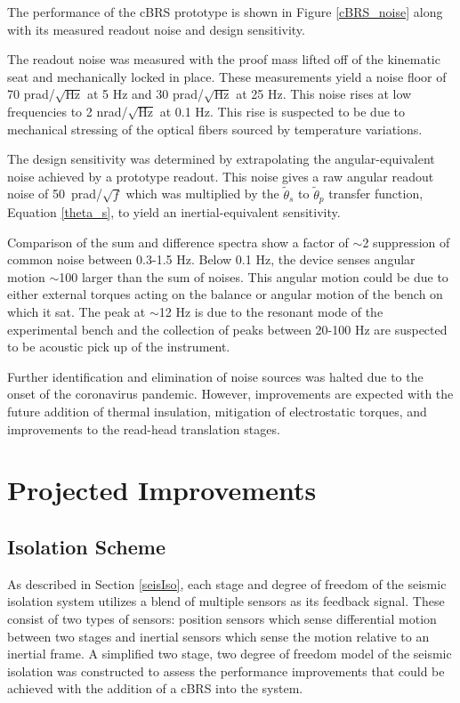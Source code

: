 \documentclass [12pt, proquest]{uwthesis}[2019]
\begin{document}
The performance of the cBRS prototype is shown in Figure \ref{cBRS_noise} along with its measured readout noise and design sensitivity. 

The readout noise was measured with the proof mass lifted off of the kinematic seat and mechanically locked in place. These measurements yield a noise floor of 70 prad/$\sqrt{\text{Hz}}$ at 5 Hz and 30 prad/$\sqrt{\text{Hz}}$ at 25 Hz. This noise rises at low frequencies to 2 nrad/$\sqrt{\text{Hz}}$ at 0.1 Hz. This rise is suspected to be due to mechanical stressing of the optical fibers sourced by temperature variations.

 The design sensitivity was determined by extrapolating the angular-equivalent noise achieved by a prototype readout. This noise gives a raw angular readout noise of 50~prad/$\sqrt{f}$ which was multiplied by the $\tilde{\theta}_{s}$ to $\tilde{\theta}_{p}$ transfer function, Equation \ref{theta_s}, to yield an inertial-equivalent sensitivity.
 
 Comparison of the sum and difference spectra show a factor of $\sim$2 suppression of common noise between 0.3-1.5 Hz. Below 0.1 Hz, the device senses angular motion $\sim$100 larger than the sum of noises. This angular motion could be due to either external torques acting on the balance or angular motion of the bench on which it sat. The peak at $\sim$12 Hz is due to the resonant mode of the experimental bench and the collection of peaks between 20-100 Hz are suspected to be acoustic pick up of the instrument. 
 
 Further identification and elimination of noise sources was halted due to the onset of the coronavirus pandemic. However, improvements are expected with the future addition of thermal insulation, mitigation of electrostatic torques, and improvements to the read-head translation stages.


\section{Projected Improvements}
\subsection{Isolation Scheme} \label{IsoScheme}

As described in Section \ref{seisIso}, each stage and degree of freedom of the seismic isolation system utilizes a blend of multiple sensors as its feedback signal. These consist of two types of sensors: position sensors which sense differential motion between two stages and inertial sensors which sense the motion relative to an inertial frame. A simplified two stage, two degree of freedom model of the seismic isolation was constructed to assess the performance improvements that could be achieved with the addition of a cBRS into the system. 
\end{document}
